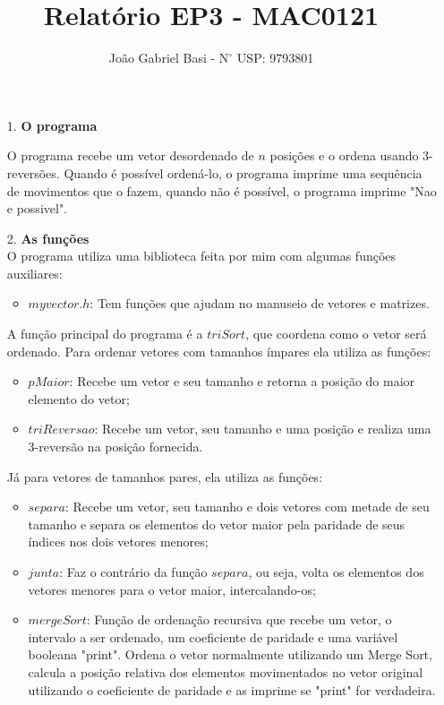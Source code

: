 \documentclass[12pt, a4paper]{article} %
\title{Relatório EP3 - MAC0121}
\date{}
\author{João Gabriel Basi - $\text{N}^\circ$ USP: 9793801}
\begin{document}
\maketitle
\begin{enumerate}
\large
\item[1.]\textbf{O programa}
\normalsize\par
O programa recebe um vetor desordenado de $n$ posições e o ordena usando 3-reversões. Quando é possível ordená-lo, o programa imprime uma sequência de movimentos que o fazem, quando não é possível, o programa imprime "Nao e possivel".\\[0.5cm]
\large
\item[2.]\textbf{As funções}
\normalsize\\[0.5cm]
O programa utiliza uma biblioteca feita por mim com algumas funções auxiliares:
\begin{itemize}
\item $myvector.h$: Tem funções que ajudam no manuseio de vetores e matrizes.
\end{itemize}
A função principal do programa é a $triSort$, que coordena como o vetor será ordenado. Para ordenar vetores com tamanhos ímpares ela utiliza as funções:
\begin{itemize}
\item $pMaior$: Recebe um vetor e seu tamanho e retorna a posição do maior elemento do vetor;
\item $triReversao$: Recebe um vetor, seu tamanho e uma posição e realiza uma 3-reversão na posição fornecida.
\end{itemize}
Já para vetores de tamanhos pares, ela utiliza as funções:
\begin{itemize}
\item $separa$: Recebe um vetor, seu tamanho e dois vetores com metade de seu tamanho e separa os elementos do vetor maior pela paridade de seus índices nos dois vetores menores;
\item $junta$: Faz o contrário da função $separa$, ou seja, volta os elementos dos vetores menores para o vetor maior, intercalando-os;
\item $mergeSort$: Função de ordenação recursiva que recebe um vetor, o intervalo a ser ordenado, um coeficiente de paridade e uma variável booleana "print". Ordena o vetor normalmente utilizando um Merge Sort, calcula a posição relativa dos elementos movimentados no vetor original utilizando o coeficiente de paridade e as imprime se "print" for verdadeira.\\[0.5cm]
\end{itemize}

\end{enumerate}
\end{document}
